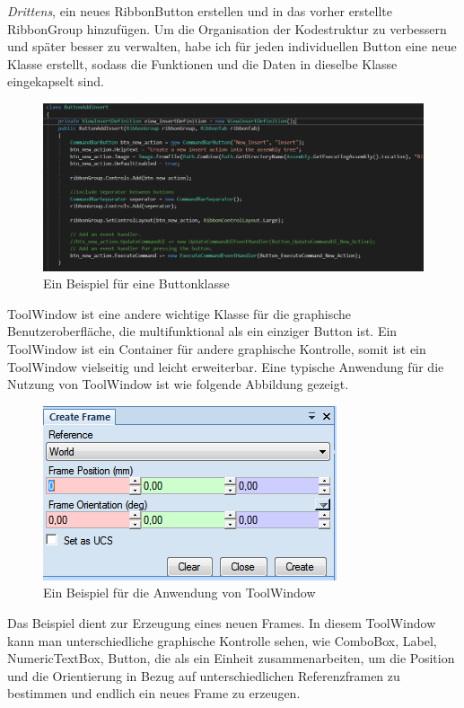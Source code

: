 \documentclass[14pt,a4paper,titlepage]{article}
\begin{document}
\begin{itemize}
				\emph{Drittens},
				 ein neues RibbonButton erstellen und in das vorher erstellte RibbonGroup hinzufügen.
				\bigbreak
				Um die Organisation der Kodestruktur zu verbessern und später besser zu verwalten, habe ich für jeden individuellen Button eine neue Klasse erstellt, sodass die Funktionen und die Daten in dieselbe Klasse eingekapselt sind.
				\bigbreak  
				\begin{figure}[h!]
					\centering
					\includegraphics[width=0.8\linewidth]{buttonclass.png}
					\caption{Ein Beispiel für eine Buttonklasse}
				\end{figure}
				ToolWindow ist eine andere wichtige Klasse für die graphische Benutzeroberfläche, die multifunktional als ein einziger Button ist. Ein ToolWindow ist ein Container für andere graphische Kontrolle, somit ist ein ToolWindow vielseitig und leicht erweiterbar.  Eine typische Anwendung für die Nutzung von ToolWindow ist wie folgende Abbildung gezeigt. \\
				\begin{figure}[h!]
					\centering
					\includegraphics[width=0.8\linewidth]{toolwindow.png}
					\caption{Ein Beispiel für die Anwendung von ToolWindow}
				\end{figure}
				\pagebreak
				Das Beispiel dient zur Erzeugung eines neuen Frames. In diesem ToolWindow kann man unterschiedliche graphische Kontrolle sehen, wie ComboBox, Label, NumericTextBox, Button, die als ein Einheit zusammenarbeiten, um die Position und die Orientierung in Bezug auf unterschiedlichen Referenzframen zu bestimmen und endlich ein neues Frame zu erzeugen.

\end{itemize}
\end{document}
